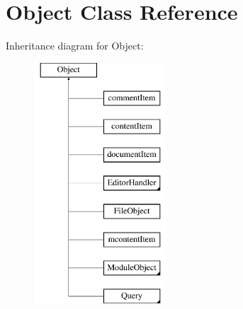 \hypertarget{classObject}{\section{Object Class Reference}
\label{classObject}
}
Inheritance diagram for Object\-:\begin{figure}[H]
\begin{center}
\leavevmode
\includegraphics[height=9.000000cm]{classObject}
\end{center}
\end{figure}
